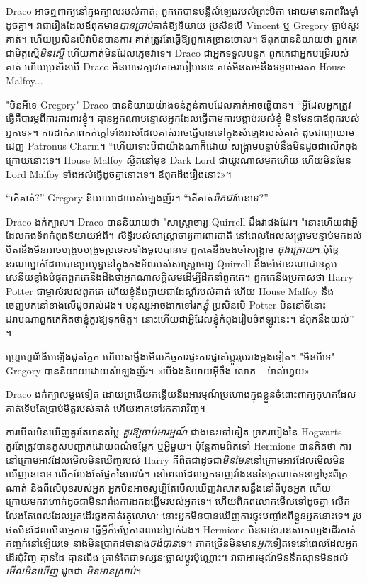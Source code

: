 {{{{{Draco អាចឮពាក្យនៅក្នុងក្បាលរបស់គាត់; ពួក​គេ​បាន​បន្លឺ​សំឡេង​របស់​ព្រះ​បិតា ដោយ​មាន​ភាព​រឹង​ម៉ាំ​ដូច​គ្នា។ វាជារឿងដែលឪពុកមាន\emph{បានប្រាប់}គាត់ឱ្យនិយាយ ប្រសិនបើ Vincent ឬ Gregory ធ្លាប់សួរគាត់។ ហើយ​ប្រសិន​បើ​វា​មិន​បាន​ការ គាត់​ត្រូវ​តែ​ធ្វើ​ឱ្យ​ពួក​គេ​ច្រាន​ចោល។ ឪពុកបាននិយាយថា ពួកគេជាមិត្តស្មើ\emph{មិនស្មើ} ហើយគាត់មិនដែលភ្លេចវាទេ។ Draco ជាអ្នកទទួលបន្ទុក ពួកគេជាអ្នកបម្រើរបស់គាត់ ហើយប្រសិនបើ Draco មិនអាចរក្សាវាតាមរបៀបនោះ គាត់មិនសមនឹងទទួលមរតក House Malfoy...

"មិនអីទេ Gregory" Draco បាននិយាយយ៉ាងទន់ភ្លន់តាមដែលគាត់អាចធ្វើបាន។ “អ្វីដែលអ្នកត្រូវធ្វើគឺបារម្ភពីការការពារខ្ញុំ។ គ្មាន​អ្នក​ណា​បន្ទោស​អ្នក​ដែល​ធ្វើ​តាម​ការ​បង្គាប់​របស់​ខ្ញុំ មិន​មែន​ជា​ឪពុក​របស់​អ្នក​ទេ»។ ការ​ដាក់​ភាព​កក់​ក្ដៅ​ទាំង​អស់​ដែល​គាត់​អាច​ធ្វើ​បាន​ទៅ​ក្នុង​សំឡេង​របស់​គាត់ ដូច​ជា​ព្យាយាម​ដេញ Patronus Charm។ “ហើយ​ទោះ​បី​ជា​យ៉ាង​ណា​ក៏​ដោយ សង្គ្រាម​បន្ទាប់​នឹង​មិន​ដូច​ជា​លើក​ចុង​ក្រោយ​នោះ​ទេ។ House Malfoy ស្ថិតនៅមុខ Dark Lord ជាយូរណាស់មកហើយ ហើយមិនមែន Lord Malfoy ទាំងអស់ធ្វើដូចគ្នានោះទេ។ ឪពុក​ដឹង​រឿង​នោះ»។

“តើគាត់?” Gregory និយាយដោយសំឡេងញ័រ។ “តើគាត់\emph{ពិតជា}មែនទេ?”

Draco ងក់ក្បាល។ Draco បាននិយាយថា "សាស្រ្តាចារ្យ Quirrell ដឹងវាផងដែរ។ "នោះហើយជាអ្វីដែលកងទ័ពកំពុងនិយាយអំពី។ សិទ្ធិរបស់សាស្ត្រាចារ្យការពារជាតិ នៅពេលដែលសង្រ្គាមបន្ទាប់មកដល់ បិតានឹងមិនអាចបង្រួបបង្រួមប្រទេសទាំងមូលបានទេ ពួកគេនឹងចងចាំសង្រ្គាម \emph{ចុងក្រោយ}។ ប៉ុន្តែនរណាម្នាក់ដែលបានប្រយុទ្ធនៅក្នុងកងទ័ពរបស់សាស្រ្តាចារ្យ Quirrell នឹងចាំថានរណាជាឧត្តមសេនីយខ្លាំងបំផុតពួកគេនឹងដឹងថាអ្នកណាសក្ដិសមដើម្បីដឹកនាំពួកគេ។ ពួកគេនឹងប្រកាសថា Harry Potter ជាម្ចាស់របស់ពួកគេ ហើយខ្ញុំនឹងក្លាយជាដៃស្តាំរបស់គាត់ ហើយ House Malfoy នឹងចេញមកនៅខាងលើដូចរាល់ដង។ មនុស្សអាចងាកទៅរក\emph{ខ្ញុំ} ប្រសិនបើ Potter មិននៅទីនោះ ដរាបណាពួកគេគិតថាខ្ញុំគួរឱ្យទុកចិត្ត។ នោះហើយជាអ្វីដែលខ្ញុំកំពុងរៀបចំឥឡូវនេះ។ ឪពុកនឹងយល់” ។

ហ្គ្រេហ្គោរី​ងើប​ឡើង​ជូត​ភ្នែក ហើយ​សម្លឹង​មើល​កិច្ចការ​ផ្ទះ​ការ​ផ្លាស់​ប្តូរ​រូប​រាង​ម្ដង​ទៀត។ "មិនអីទេ" Gregory បាននិយាយដោយសំឡេងញ័រ។ «បើ​ឯង​និយាយ​អ៊ីចឹង លោក ~ ម៉ាល់ហ្វយ»

Draco ងក់ក្បាលម្តងទៀត ដោយព្រងើយកន្តើយនឹងអារម្មណ៍ប្រហោងក្នុងខ្លួនចំពោះពាក្យកុហកដែលគាត់ទើបតែប្រាប់មិត្តរបស់គាត់ ហើយងាកទៅរកតារាវិញ។


ការមើលមិនឃើញគួរតែមានតម្លៃ \emph{គួរឱ្យចាប់អារម្មណ៍} ជាងនេះទៅទៀត ច្រករបៀងនៃ Hogwarts គួរតែត្រូវបានគូសបញ្ជាក់ដោយពណ៌ចម្លែក ឬអ្វីមួយ។ ប៉ុន្តែតាមពិតទៅ Hermione បានគិតថា ការនៅក្រោមអាវដែលមើលមិនឃើញរបស់ Harry គឺពិតជាដូចជា\emph{មិនមែន}នៅក្រោមអាវដែលមើលមិនឃើញនោះទេ លើកលែងតែផ្នែកនៃអាវធំ។ នៅពេលដែលអ្នកទាញវាំងនននៃក្រណាត់ទន់ខ្មៅចុះពីក្រណាត់ និងពីលើមុខរបស់អ្នក អ្នកមិនអាចសូម្បីតែមើលឃើញវាលាតសន្ធឹងនៅពីមុខអ្នក ហើយក្រោយមកវាហាក់ដូចជាមិនរារាំងការដកដង្ហើមរបស់អ្នកទេ។ ហើយពិភពលោកមើលទៅដូចគ្នា លើកលែងតែពេលដែលអ្នកដើរឆ្លងកាត់វត្ថុលោហៈ នោះអ្នកមិនបានឃើញការឆ្លុះបញ្ចាំងពីខ្លួនអ្នកនោះទេ។ រូប​ថត​មិន​ដែល​មើល​អ្នក​ទេ ធ្វើ​អ្វី​ក៏​ចម្លែក​ពេល​នៅ​ម្នាក់​ឯង។ Hermione មិនទាន់បានសាកល្បងដើរកាត់កញ្ចក់នៅឡើយទេ នាងមិនប្រាកដថានាង\emph{ចង់បាន}ទេ។ ភាគច្រើនមិនមាន\emph{អ្នក}ទៀតទេនៅពេលដែលអ្នកដើរជុំវិញ គ្មានដៃ គ្មានជើង គ្រាន់តែជាទស្សនៈផ្លាស់ប្តូរប៉ុណ្ណោះ។ វា​ជា​អារម្មណ៍​មិន​នឹក​ស្មាន​មិន​ដល់ \emph{មើល​មិន​ឃើញ} ដូច​ជា \emph{មិន​មាន​ស្រាប់}។

}}}}}
